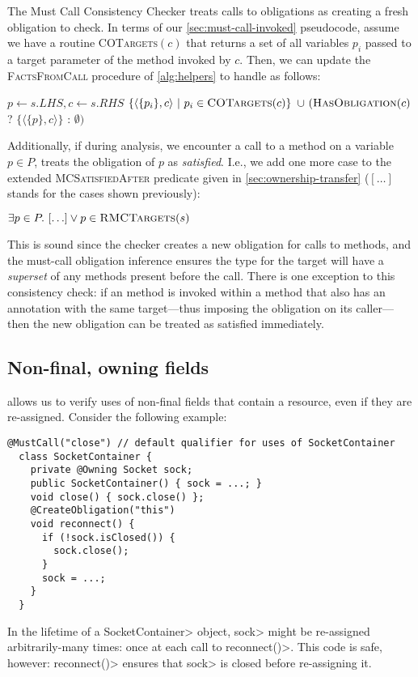 The Must Call Consistency Checker treats calls to \ResetMustCall obligations
as creating a fresh obligation to check.  In terms of our \cref{sec:must-call-invoked} pseudocode,
assume we have a routine \textsc{COTargets}$(c)$ that returns a set of all
variables $p_i$ passed to a \ResetMustCall target parameter of the method
invoked by $c$.  Then, we can update the \textsc{FactsFromCall} procedure of
\cref{alg:helpers} to handle \ResetMustCall as follows:
\begin{algorithmic}
  \State $p \gets s.LHS, c \gets s.RHS$
  \State \Return $\{ \langle \{ p_i \}, c \rangle\ |\ p_i \in \textsc{COTargets}(c) \}$ \newline
  \hspace*{5em} $\cup\ (\textsc{HasObligation}(c)$ ? $\{ \langle \{ p \}, c \rangle \}$ : $\emptyset)$
  \EndProcedure
  \end{algorithmic}
Additionally, if during analysis, we encounter a call to a \ResetMustCall
method on a variable $p \in P$, \Tool treats the \MustCall
obligation of $p$ as \emph{satisfied}.  I.e., we add one more
case to the extended \textsc{MCSatisfiedAfter} predicate given in
\cref{sec:ownership-transfer} ($[\ldots]$ stands for the cases shown previously):
\begin{algorithmic}
  \State \Return $\exists p \in P .\ [\ldots] \vee p \in \textsc{RMCTargets}(s)$
  \EndProcedure
\end{algorithmic}
\noindent
This is sound since the checker creates a new obligation for calls to
\ResetMustCall methods, and the must-call obligation inference ensures the
\MustCall type for the target will have a \emph{superset} of any methods present
before the call.
There is one exception to this consistency check: if an \ResetMustCall
method is invoked within a method that also has an \ResetMustCall annotation
with the same target---thus imposing the obligation on its caller---then
the new obligation can be treated as satisfied immediately.

\subsection{Non-final, owning fields}
\label{sec:non-final-owning}

\ResetMustCall allows us to verify uses of non-final fields
that contain a resource, even if they are re-assigned. Consider
the following example:

\begin{lstlisting}[frame=tb,belowskip=3mm]
  @MustCall("close") // default qualifier for uses of SocketContainer
  class SocketContainer {
    private @Owning Socket sock;
    public SocketContainer() { sock = ...; } 
    void close() { sock.close() };
    @CreateObligation("this")
    void reconnect() {
      if (!sock.isClosed()) {
        sock.close();
      }
      sock = ...;
    }
  }
\end{lstlisting}
In the lifetime of a \<SocketContainer> object, \<sock>
might be re-assigned arbitrarily-many times: once at each
call to \<reconnect()>. This code is safe, however: \<reconnect()>
ensures that \<sock> is closed before re-assigning it.

